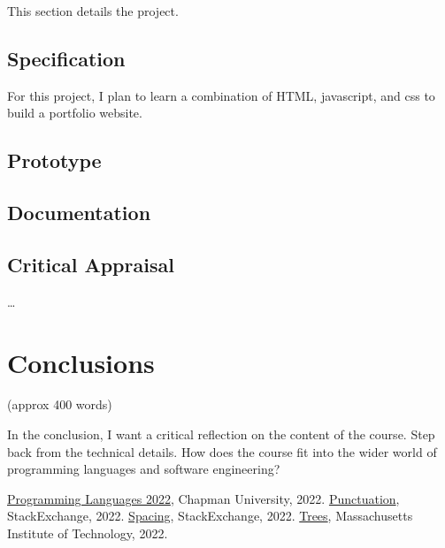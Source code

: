 \documentclass{article}
\theoremstyle{theorem}
\theoremstyle{definition}
\theoremstyle{remark}
\begin{document}
This section details the project.

\subsection{Specification}
For this project, I plan to learn a combination of HTML, javascript, and css to build a portfolio website. 
\subsection{Prototype}
\subsection{Documentation}
\subsection{Critical Appraisal}

\ldots

\section{Conclusions}\label{conclusions}

(approx 400 words)

In the conclusion, I want a critical reflection on the content of the course. Step back from the technical details. How does the course fit into the wider world of programming languages and software engineering?

\begin{thebibliography}{99}
 \href{https://github.com/alexhkurz/programming-languages-2022/blob/main/README.md}{Programming Languages 2022}, Chapman University, 2022.
 \href{https://tex.stackexchange.com/questions/2369/why-do-the-less-than-symbol-and-the-greater-than-symbol-appear-wrong-as}{Punctuation}, StackExchange, 2022.
 \href{https://tex.stackexchange.com/questions/14526/spaces-behind-textgreater-not-working-as-expected}{Spacing}, StackExchange, 2022.
 \href{http://sznfong.scripts.mit.edu/site/wp-content/uploads/2018/03/treedrawingtutorialv2.pdf}{Trees}, Massachusetts Institute of Technology, 2022.
\end{thebibliography}
\end{document}
